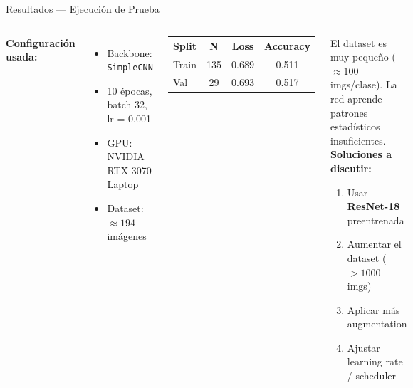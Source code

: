 \documentclass[aspectratio=169,10pt]{beamer}
\begin{document}
\begin{frame}{Resultados --- Ejecución de Prueba}

    \begin{columns}
        \textbf{Configuración usada:}
        \begin{itemize}
            \item Backbone: \texttt{SimpleCNN}
            \item 10 épocas, batch 32, lr = 0.001
            \item GPU: NVIDIA RTX 3070 Laptop
            \item Dataset: $\approx 194$ imágenes
        \end{itemize}

        \vspace{6pt}
        \begin{tcolorbox}[colback=lightgray, colframe=pyblue!60]
            \scriptsize\centering
            \begin{tabular}{lccc}
                \toprule
                Split & N & Loss & Accuracy \\
                \midrule
                Train & 135 & 0.689 & 0.511 \\
                Val   & 29  & 0.693 & 0.517 \\
                \bottomrule
            \end{tabular}
        \end{tcolorbox}

        \begin{tcolorbox}[colback=pyorange!15, colframe=pyorange!80, title=\scriptsize¿Por qué $\approx 50\%$?]
            \scriptsize
            El dataset es muy pequeño ($\approx 100$ imgs/clase). La red aprende patrones estadísticos insuficientes.\\[6pt]
            \textbf{Soluciones a discutir:}
            \begin{enumerate}
                \item Usar \textbf{ResNet-18} preentrenada
                \item Aumentar el dataset ($>1000$ imgs)
                \item Aplicar más augmentation
                \item Ajustar learning rate / scheduler
            \end{enumerate}
        \end{tcolorbox}
    \end{columns}
\end{frame}
\end{document}
